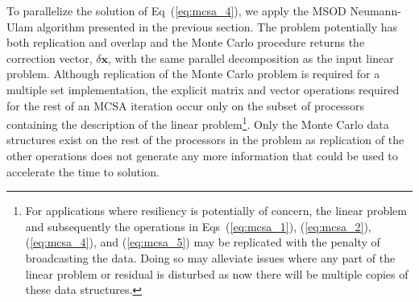 \documentclass{snamc2013}
\begin{document}
To parallelize the solution of Eq~(\ref{eq:mcsa_4}), we apply the MSOD
Neumann-Ulam algorithm presented in the previous section. The problem
potentially has both replication and overlap and the Monte Carlo
procedure returns the correction vector, $\delta \mathbf{x}$, with the
same parallel decomposition as the input linear problem. Although
replication of the Monte Carlo problem is required for a multiple set
implementation, the explicit matrix and vector operations required for
the rest of an MCSA iteration occur only on the subset of processors
containing the description of the linear problem\footnote{For
  applications where resiliency is potentially of concern, the linear
  problem and subsequently the operations in Eqs~(\ref{eq:mcsa_1}),
  (\ref{eq:mcsa_2}), (\ref{eq:mcsa_4}), and (\ref{eq:mcsa_5}) may be
  replicated with the penalty of broadcasting the data. Doing so may
  alleviate issues where any part of the linear problem or residual is
  disturbed as now there will be multiple copies of these data
  structures.}. Only the Monte Carlo data structures exist on the rest
of the processors in the problem as replication of the other
operations does not generate any more information that could be used
to accelerate the time to solution.

\end{document}
